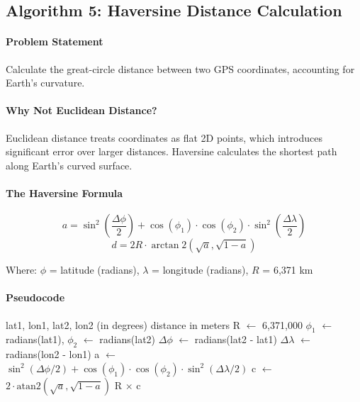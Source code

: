 \subsection{Algorithm 5: Haversine Distance Calculation}

\paragraph{Problem Statement}
Calculate the great-circle distance between two GPS coordinates, accounting for Earth's curvature.

\paragraph{Why Not Euclidean Distance?}
Euclidean distance treats coordinates as flat 2D points, which introduces significant error over larger distances. Haversine calculates the shortest path along Earth's curved surface.

\paragraph{The Haversine Formula}

\begin{equation}
    a = \sin^2\left(\frac{\Delta\phi}{2}\right) + \cos(\phi_1) \cdot \cos(\phi_2) \cdot \sin^2\left(\frac{\Delta\lambda}{2}\right)
\end{equation}
\begin{equation}
    d = 2R \cdot \arctan2\left(\sqrt{a}, \sqrt{1-a}\right)
\end{equation}

Where: $\phi$ = latitude (radians), $\lambda$ = longitude (radians), $R$ = 6,371 km

\paragraph{Pseudocode}

\begin{algorithm}[H]
\caption{Haversine Distance}
\begin{algorithmic}[1]
\REQUIRE lat1, lon1, lat2, lon2 (in degrees)
\ENSURE distance in meters
\STATE R $\gets$ 6,371,000 
\STATE $\phi_1$ $\gets$ radians(lat1), $\phi_2$ $\gets$ radians(lat2)
\STATE $\Delta\phi$ $\gets$ radians(lat2 - lat1)
\STATE $\Delta\lambda$ $\gets$ radians(lon2 - lon1)
\STATE a $\gets$ $\sin^2(\Delta\phi/2) + \cos(\phi_1) \cdot \cos(\phi_2) \cdot \sin^2(\Delta\lambda/2)$
\STATE c $\gets$ $2 \cdot \text{atan2}(\sqrt{a}, \sqrt{1-a})$
\RETURN R $\times$ c
\end{algorithmic}
\end{algorithm}

